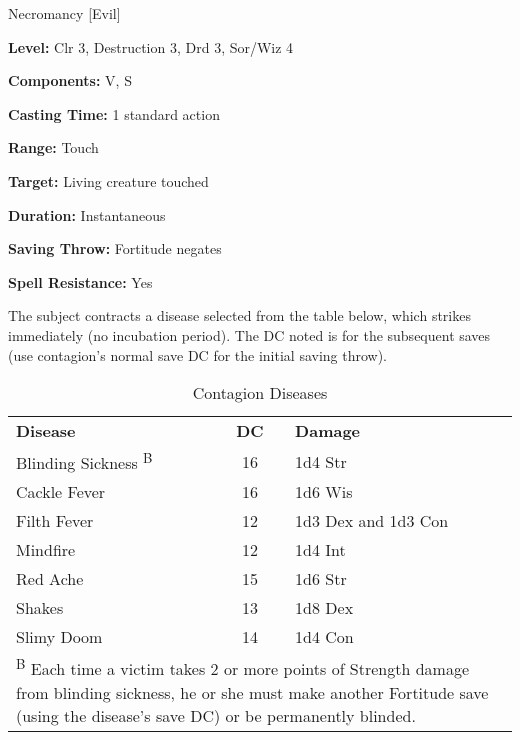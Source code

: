
Necromancy [Evil]

\textbf{Level:} Clr 3, Destruction 3, Drd 3, Sor/Wiz 4

\textbf{Components:} V, S

\textbf{Casting Time:} 1 standard action

\textbf{Range:} Touch

\textbf{Target:} Living creature touched

\textbf{Duration:} Instantaneous

\textbf{Saving Throw:} Fortitude negates

\textbf{Spell Resistance:} Yes

The subject contracts a disease selected from the table below, which strikes immediately 
(no incubation period). The DC noted is for the subsequent saves (use contagion's 
normal save DC for the initial saving throw).

\begin{table}[htb]
\caption{Contagion Diseases}
\centering
\begin{tabular}{l c l}
\textbf{Disease} & \textbf{DC} & \textbf{Damage} \\
Blinding Sickness \textsuperscript{B} & 16 & 1d4 Str\\
Cackle Fever & 16 & 1d6 Wis\\
Filth Fever & 12 & 1d3 Dex and 1d3 Con\\
Mindfire & 12 & 1d4 Int\\
Red Ache & 15 & 1d6 Str\\
Shakes & 13 & 1d8 Dex\\
Slimy Doom & 14 & 1d4 Con\\
\multicolumn{3}{p{7cm}}{\textsuperscript{B} Each time a victim takes 2 or more points of Strength damage from blinding sickness, he or she must make another Fortitude save (using the disease's save DC) or be permanently blinded.}\\
\end{tabular}
\end{table}
